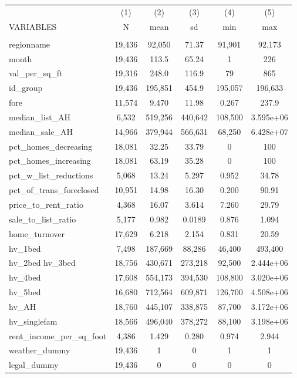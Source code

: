 \begin{tabular}{lccccc} \hline
 & (1) & (2) & (3) & (4) & (5) \\
VARIABLES & N & mean & sd & min & max \\ \hline
 &  &  &  &  &  \\
regionname & 19,436 & 92,050 & 71.37 & 91,901 & 92,173 \\
month & 19,436 & 113.5 & 65.24 & 1 & 226 \\
val\_per\_sq\_ft & 19,316 & 248.0 & 116.9 & 79 & 865 \\
id\_group & 19,436 & 195,851 & 454.9 & 195,057 & 196,633 \\
fore & 11,574 & 9.470 & 11.98 & 0.267 & 237.9 \\
median\_list\_AH & 6,532 & 519,256 & 440,642 & 108,500 & 3.595e+06 \\
median\_sale\_AH & 14,966 & 379,944 & 566,631 & 68,250 & 6.428e+07 \\
pct\_homes\_decreasing & 18,081 & 32.25 & 33.79 & 0 & 100 \\
pct\_homes\_increasing & 18,081 & 63.19 & 35.28 & 0 & 100 \\
pct\_w\_list\_reductions & 5,068 & 13.24 & 5.297 & 0.952 & 34.78 \\
pct\_of\_trans\_foreclosed & 10,951 & 14.98 & 16.30 & 0.200 & 90.91 \\
price\_to\_rent\_ratio & 4,368 & 16.07 & 3.614 & 7.260 & 29.79 \\
sale\_to\_list\_ratio & 5,177 & 0.982 & 0.0189 & 0.876 & 1.094 \\
home\_turnover & 17,629 & 6.218 & 2.154 & 0.831 & 20.59 \\
hv\_1bed & 7,498 & 187,669 & 88,286 & 46,400 & 493,400 \\
hv\_2bed 
hv\_3bed & 18,756 & 430,671 & 273,218 & 92,500 & 2.444e+06 \\
hv\_4bed & 17,608 & 554,173 & 394,530 & 108,800 & 3.020e+06 \\
hv\_5bed & 16,680 & 712,564 & 609,871 & 126,700 & 4.508e+06 \\
hv\_AH & 18,760 & 445,107 & 338,875 & 87,700 & 3.172e+06 \\
hv\_singlefam & 18,566 & 496,040 & 378,272 & 88,100 & 3.198e+06 \\
rent\_income\_per\_sq\_foot & 4,386 & 1.429 & 0.280 & 0.974 & 2.944 \\
weather\_dummy & 19,436 & 1 & 0 & 1 & 1 \\
legal\_dummy & 19,436 & 0 & 0 & 0 & 0 \\

\end{tabular}
